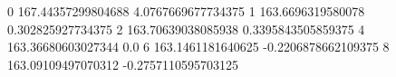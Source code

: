 0 167.44357299804688 4.0767669677734375
1 163.6696319580078 0.302825927734375
2 163.70639038085938 0.3395843505859375
4 163.36680603027344 0.0
6 163.1461181640625 -0.2206878662109375
8 163.09109497070312 -0.2757110595703125
